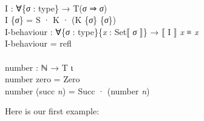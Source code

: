 \documentclass{entcs} \usepackage{prentcsmacro}
\newcommand{\AgdaFontStyle}[1]{\textsf{#1}}
\newcommand{\AgdaBoundFontStyle}[1]{\textit{#1}}
\newcommand{\AgdaSymbol}      [1]{\textcolor{AgdaSymbol}{#1}}
\newcommand{\AgdaBound}    [1]{\AgdaBoundFontStyle{\textcolor{AgdaBound}{#1}}}
\newcommand{\AgdaInductiveConstructor}[1]
    {\AgdaFontStyle{\textcolor{AgdaInductiveConstructor}{#1}}}
\newcommand{\AgdaDatatype} [1]{\AgdaFontStyle{\textcolor{AgdaDatatype}{#1}}}
\newcommand{\AgdaFunction} [1]{\AgdaFontStyle{\textcolor{AgdaFunction}{#1}}}
\newcommand{\AgdaCodeStyle}{\small}
\newenvironment{code}%
{\noindent\AgdaCodeStyle\pboxed}%
{\endpboxed\par\noindent%
\ignorespacesafterend}
\begin{document}
\begin{code}\>\<%
\\
\>\AgdaFunction{I} \AgdaSymbol{:} \AgdaSymbol{∀\{}\AgdaBound{σ} \AgdaSymbol{:} \AgdaDatatype{type}\AgdaSymbol{\}} \AgdaSymbol{→} \AgdaDatatype{T}\AgdaSymbol{(}\AgdaBound{σ} \AgdaInductiveConstructor{⇒} \AgdaBound{σ}\AgdaSymbol{)}\<%
\\
\>\AgdaFunction{I} \AgdaSymbol{\{}\AgdaBound{σ}\AgdaSymbol{\}} \AgdaSymbol{=} \AgdaInductiveConstructor{S} \AgdaInductiveConstructor{·} \AgdaInductiveConstructor{K} \AgdaInductiveConstructor{·} \AgdaSymbol{(}\AgdaInductiveConstructor{K} \AgdaSymbol{\{}\AgdaBound{σ}\AgdaSymbol{\}} \AgdaSymbol{\{}\AgdaBound{σ}\AgdaSymbol{\})}\<%
\\
\>\AgdaFunction{I-behaviour} \AgdaSymbol{:} \AgdaSymbol{∀\{}\AgdaBound{σ} \AgdaSymbol{:} \AgdaDatatype{type}\AgdaSymbol{\}\{}\AgdaBound{x} \AgdaSymbol{:} \AgdaFunction{Set⟦} \AgdaBound{σ} \AgdaFunction{⟧}\AgdaSymbol{\}} \AgdaSymbol{→} \AgdaFunction{⟦} \AgdaFunction{I} \AgdaFunction{⟧} \AgdaBound{x} \AgdaDatatype{≡} \AgdaBound{x}\<%
\\
\>\AgdaFunction{I-behaviour} \AgdaSymbol{=} \AgdaInductiveConstructor{refl} \<[19]%
\>[19]\<%
\\
%
\\
\>\AgdaFunction{number} \AgdaSymbol{:} \AgdaDatatype{ℕ} \AgdaSymbol{→} \AgdaDatatype{T} \AgdaInductiveConstructor{ι}\<%
\\
\>\AgdaFunction{number} \AgdaInductiveConstructor{zero} \AgdaSymbol{=} \AgdaInductiveConstructor{Zero}\<%
\\
\>\AgdaFunction{number} \AgdaSymbol{(}\AgdaInductiveConstructor{succ} \AgdaBound{n}\AgdaSymbol{)} \AgdaSymbol{=} \AgdaInductiveConstructor{Succ} \AgdaInductiveConstructor{·} \AgdaSymbol{(}\AgdaFunction{number} \AgdaBound{n}\AgdaSymbol{)}\<%
\\
\>\<\end{code}
Here is our first example:
\end{document}
